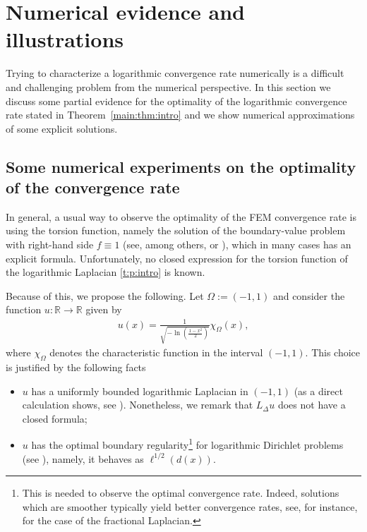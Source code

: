 \documentclass[11 pt]{article}
\numberwithin{equation}{section}
\def\R{\mathbb{R}}
\begin{document}
\section{Numerical evidence and illustrations}\label{sec:numerics}

Trying to characterize a logarithmic convergence rate numerically is a difficult and challenging problem from the numerical perspective. In this section we discuss some partial evidence for the optimality of the logarithmic convergence rate stated in Theorem~\ref{main:thm:intro} and we show numerical approximations of some explicit solutions.

\subsection{Some numerical experiments on the optimality of the convergence rate}

In general, a usual way to observe the optimality of the FEM convergence rate is using the torsion function, namely the solution of the boundary-value problem with right-hand side $f\equiv 1$ (see, among others, \cite[Section 5]{AB17} or \cite[Section 5]{BHS19}), which in many cases has an explicit formula. Unfortunately, no closed expression for the torsion function of the logarithmic Laplacian \eqref{t:p:intro} is known.

Because of this, we propose the following. Let $\Omega:=(-1,1)$ and consider the function $u:\R\to\R$ given by
\begin{align}\label{udef}
 u(x)=\frac{1}{\sqrt{-\ln\left(\frac{1-x^2}{2}\right)}} \chi_{\Omega}(x),
\end{align}
where $\chi_{\Omega}$ denotes the characteristic function in the interval $(-1,1)$.  This choice is justified by the following facts
\begin{itemize}
 \item $u$ has a uniformly bounded logarithmic Laplacian in $(-1,1)$ (as a direct calculation shows, see \cite[Theorem 2.4]{HSLRS23}). Nonetheless, we remark that $L_{\Delta} u$ does not have a closed formula;
 \item $u$ has the optimal boundary regularity\footnote{This is needed to observe the optimal convergence rate. Indeed, solutions which are smoother typically yield better convergence rates, see, for instance, \cite[Section 5 and Table 2]{AB17} for the case of the fractional Laplacian.} for logarithmic Dirichlet problems (see \cite[Theorem 1.2]{HSLRS23}), namely, it behaves as $\ell^{1/2}(d(x))$.
\end{itemize}
\end{document}
